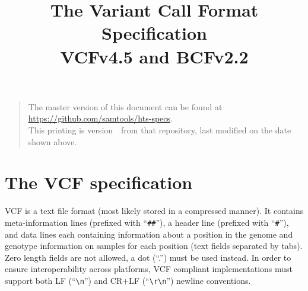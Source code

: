 \documentclass[8pt]{article}
\begin{document}

\title{The Variant Call Format Specification \\ \vspace{0.5em} \large VCFv4.5 and BCFv2.2}
\date{\headdate}
\maketitle
\begin{quote}\small
The master version of this document can be found at \url{https://github.com/samtools/hts-specs}.\\
This printing is version~\commitdesc\ from that repository, last modified on the date shown above.
\end{quote}
\vspace*{1em}

\newpage
\tableofcontents
\newpage

\section{The VCF specification}
VCF is a text file format (most likely stored in a compressed manner).
It contains meta-information lines (prefixed with ``\verb|##|''), a header line (prefixed with ``\verb|#|''), and data lines each containing information about a position in the genome and genotype information on samples for each position (text fields separated by tabs).
Zero length fields are not allowed, a dot (``.'') must be used instead.
In order to ensure interoperability across platforms, VCF compliant implementations must support both LF (``\verb|\n|'') and CR+LF (``\verb|\r\n|'') newline conventions.
\end{document}
